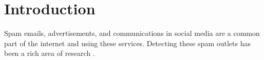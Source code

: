 \section{Introduction}
\label{sec:introduction}

Spam emails, advertisements, and communications in social media are a
common part of the internet and using these services. Detecting these
spam outlets has been a rich area of research
\citep{Cormack:2008:ESF:1454707.1454708,
DBLP:journals/corr/cs-CL-0009009, Androutsopoulos2006LearningTF,
Bickel:2006:DSF:2976456.2976477, Bratko:2006:SFU:1248547.1248644,
Solan:inproceedings, Cresci:2017:PSS:3041021.3055135,
fameforsale2015, INUWADUTSE2018496, FM2793}.

